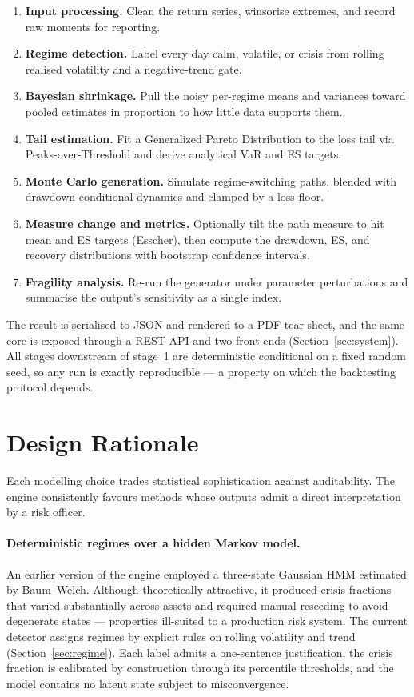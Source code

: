 \documentclass[11pt]{article}
\theoremstyle{definition}
\begin{document}
\begin{enumerate}[leftmargin=1.7em, itemsep=2pt]
  \item \textbf{Input processing.} Clean the return series, winsorise extremes,
  and record raw moments for reporting.
  \item \textbf{Regime detection.} Label every day calm, volatile, or crisis
  from rolling realised volatility and a negative-trend gate.
  \item \textbf{Bayesian shrinkage.} Pull the noisy per-regime means and
  variances toward pooled estimates in proportion to how little data supports
  them.
  \item \textbf{Tail estimation.} Fit a Generalized Pareto Distribution to the
  loss tail via Peaks-over-Threshold and derive analytical VaR and ES targets.
  \item \textbf{Monte Carlo generation.} Simulate regime-switching paths,
  blended with drawdown-conditional dynamics and clamped by a loss floor.
  \item \textbf{Measure change and metrics.} Optionally tilt the path measure to
  hit mean and ES targets (Esscher), then compute the drawdown, ES, and recovery
  distributions with bootstrap confidence intervals.
  \item \textbf{Fragility analysis.} Re-run the generator under parameter
  perturbations and summarise the output's sensitivity as a single index.
\end{enumerate}

The result is serialised to JSON and rendered to a PDF tear-sheet, and the same
core is exposed through a REST API and two front-ends (Section~\ref{sec:system}).
All stages downstream of stage~1 are deterministic conditional on a fixed random
seed, so any run is exactly reproducible --- a property on which the backtesting
protocol depends.

\section{Design Rationale}
\label{sec:rationale}

Each modelling choice trades statistical sophistication against auditability. The
engine consistently favours methods whose outputs admit a direct interpretation by
a risk officer.

\paragraph{Deterministic regimes over a hidden Markov model.}
An earlier version of the engine employed a three-state Gaussian HMM estimated by
Baum--Welch. Although theoretically attractive, it produced crisis fractions that
varied substantially across assets and required manual reseeding to avoid
degenerate states --- properties ill-suited to a production risk system. The
current detector assigns regimes by explicit rules on rolling volatility and trend
(Section~\ref{sec:regime}). Each label admits a one-sentence justification, the
crisis fraction is calibrated by construction through its percentile thresholds,
and the model contains no latent state subject to misconvergence.
\end{document}
